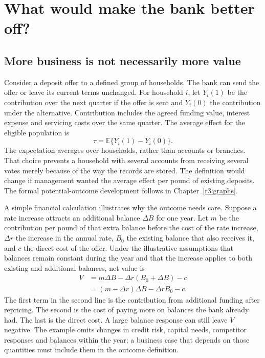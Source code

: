 \chapter{What would make the bank better off?}
\label{reading:banking-decision}

\section{More business is not necessarily more value}

Consider a deposit offer to a defined group of households. The bank can send
the offer or leave its current terms unchanged. For household $i$, let
$Y_i(1)$ be the contribution over the next quarter if the offer is sent and
$Y_i(0)$ the contribution under the alternative. Contribution includes the
agreed funding value, interest expense and servicing costs over the same
quarter. The average effect for the eligible population is
\[
 \tau=\mathbb E\{Y_i(1)-Y_i(0)\}.
\]
The expectation averages over households, rather than accounts or branches.
That choice prevents a household with several accounts from receiving several
votes merely because of the way the records are stored. The definition would
change if management wanted the average effect per pound of existing deposits.
The formal potential-outcome development follows in Chapter~\ref{r3:graphs}.

A simple financial calculation illustrates why the outcome needs care. Suppose
a rate increase attracts an additional balance $\Delta B$ for one year. Let
$m$ be the contribution per pound of that extra balance before the cost of the
rate increase, $\Delta r$ the increase in the annual rate, $B_0$ the existing
balance that also receives it, and $c$ the direct cost of the offer. Under the
illustrative assumptions that balances remain constant during the year and
that the increase applies to both existing and additional balances, net value is
\begin{align}
 V&=m\Delta B-\Delta r(B_0+\Delta B)-c\\
  &=(m-\Delta r)\Delta B-\Delta r B_0-c.
 \label{reading:deposit-value}
\end{align}
The first term in the second line is the contribution from additional funding
after repricing. The second is the cost of paying more on balances the bank
already had. The last is the direct cost. A large balance response can still
leave $V$ negative. The example omits changes in credit risk, capital needs,
competitor responses and balances within the year; a business case that depends
on those quantities must include them in the outcome definition.


